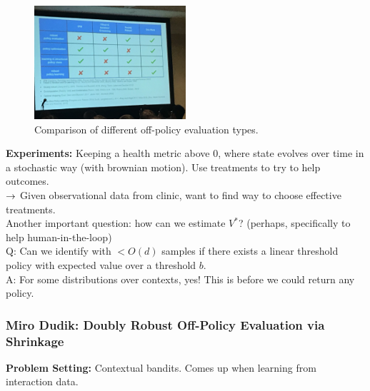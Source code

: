 \begin{figure}
    \centering
    \includegraphics[width=0.5\textwidth]{images/off_pol.JPG}
    \caption{Comparison of different off-policy evaluation types.}
    \label{fig:off_policy}
\end{figure}

{\bf Experiments:} Keeping a health metric above 0, where state evolves over time in a stochastic way (with brownian motion). Use treatments to try to help outcomes. \\

$\rightarrow$ Given observational data from clinic, want to find way to choose effective treatments. \\

Another important question: how can we estimate $V^*$? (perhaps, specifically to help human-in-the-loop)\\

Q: Can we identify with $< O (d)$ samples if there exists a linear threshold policy with expected value over a threshold $b$. \\

A: For some distributions over contexts, yes! This is before we could return any policy.

\spacerule


\subsubsection{Miro Dudik: Doubly Robust Off-Policy Evaluation via Shrinkage}

{\bf Problem Setting:} Contextual bandits. Comes up when learning from interaction data.\\


